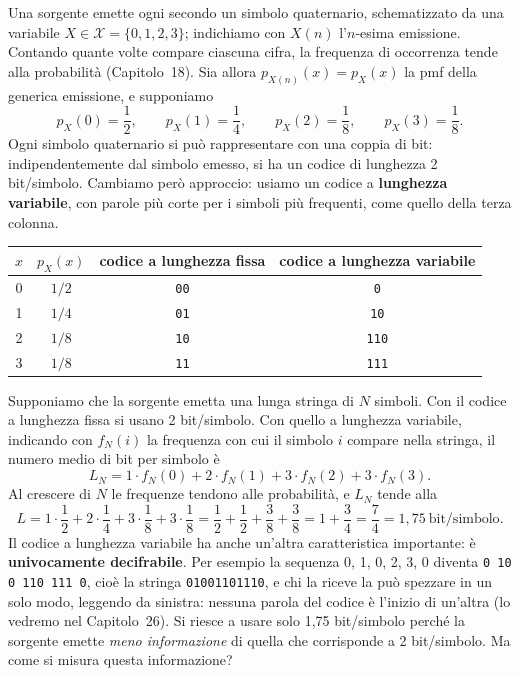Una sorgente emette ogni secondo un simbolo quaternario, schematizzato da una variabile $X \in \mathcal{X} = \{0, 1, 2,
3\}$; indichiamo con $X(n)$ l'$n$-esima emissione. Contando quante volte compare ciascuna cifra, la frequenza di
occorrenza tende alla probabilità (Capitolo~18). Sia allora $p_{X(n)}(x) = p_X(x)$ la pmf della generica emissione, e
supponiamo
\[ p_X(0) = \frac12 , \qquad p_X(1) = \frac14 , \qquad p_X(2) = \frac18 , \qquad p_X(3) = \frac18 . \]
Ogni simbolo quaternario si può rappresentare con una coppia di bit: indipendentemente dal simbolo emesso, si ha un
codice di lunghezza 2 bit/simbolo. Cambiamo però approccio: usiamo un codice a \textbf{lunghezza variabile}, con parole
più corte per i simboli più frequenti, come quello della terza colonna.
\begin{center}
\renewcommand{\arraystretch}{1.25}
\begin{tabular}{@{}c|c|c|c@{}}
  $x$ & $p_X(x)$ & codice a lunghezza fissa & codice a lunghezza variabile \\ \hline
  0 & $1/2$ & \texttt{00} & \texttt{0} \\
  1 & $1/4$ & \texttt{01} & \texttt{10} \\
  2 & $1/8$ & \texttt{10} & \texttt{110} \\
  3 & $1/8$ & \texttt{11} & \texttt{111}
\end{tabular}
\end{center}
Supponiamo che la sorgente emetta una lunga stringa di $N$ simboli. Con il codice a lunghezza fissa si usano 2
bit/simbolo. Con quello a lunghezza variabile, indicando con $f_N(i)$ la frequenza con cui il simbolo $i$ compare nella
stringa, il numero medio di bit per simbolo è
\[ L_N = 1 \cdot f_N(0) + 2 \cdot f_N(1) + 3 \cdot f_N(2) + 3 \cdot f_N(3) . \]
Al crescere di $N$ le frequenze tendono alle probabilità, e $L_N$ tende alla 
\[ L = 1 \cdot \frac12 + 2 \cdot \frac14 + 3 \cdot \frac18 + 3 \cdot \frac18 = \frac12 + \frac12 + \frac38 + \frac38 =
   1 + \frac34 = \frac74 = 1{,}75 \ \text{bit/simbolo} . \]
Il codice a lunghezza variabile ha anche un'altra caratteristica importante: è \textbf{univocamente decifrabile}. Per
esempio la sequenza 0, 1, 0, 2, 3, 0 diventa \texttt{0 10 0 110 111 0}, cioè la stringa \texttt{01001101110}, e chi la
riceve la può spezzare in un solo modo, leggendo da sinistra: nessuna parola del codice è l'inizio di un'altra (lo
vedremo nel Capitolo~26). Si riesce a usare solo 1,75 bit/simbolo perché la sorgente emette \emph{meno informazione} di
quella che corrisponde a 2 bit/simbolo. Ma come si misura questa informazione?

